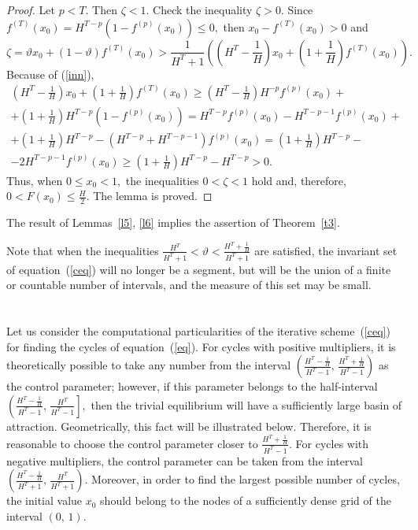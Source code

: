 \documentclass[12pt,a4paper]{amsart}
\begin{document}
\begin{proof}
Let $p<T.$ Then $\zeta < 1.$ Check the inequality $\zeta > 0.$ Since 
$f^{(T)}(x_0) = H^{T-p} \left(1 - f^{(p)}(x_0)\right) \leq 0,$ then $x_0 - f^{(T)}(x_0) > 0$ and
 $$
\zeta=\vartheta x_0 + (1-\vartheta)f^{(T)}(x_0) > 
\frac{1}{H^T + 1} \left ( \left(H^T - \frac{1}{H}\right)x_0 + \left(1 + \frac{1}{H}\right) f^{(T)}(x_0) \right).
$$
Because of (\ref{inn}), 
\begin{gather*}
\left(H^T - \frac{1}{H}\right)x_0 + \left(1 + \frac{1}{H}\right) f^{(T)}(x_0) \geq 
\left(H^T - \frac{1}{H}\right) H^{-p} f^{(p)}(x_0) + \\
+ \left(1 + \frac{1}{H}\right) H^{T-p} \left(1- f^{(p)}(x_0)\right) = H^{T-p} f^{(p)}(x_0) - H^{T-p-1} f^{(p)}(x_0) +\\
+ \left(1 + \frac{1}{H}\right) H^{T-p} - \left(H^{T-p}+H^{T-p-1}\right)f^{(p)}(x_0) = \left(1 + \frac{1}{H}\right) H^{T-p} - \\
- 2 H^{T-p-1}f^{(p)}(x_0) \geq \left(1 + \frac{1}{H}\right) H^{T-p} - H^{T-p} >0.
\end{gather*}
Thus, when $0 \leq x_0 < 1,$ the inequalities $0<\zeta<1$ hold and, therefore, $0 < F(x_0) \leq \frac{H}{2}.$ 
The lemma is proved. 
\end{proof}

The result of Lemmas~\ref{l5}, \ref{l6} implies the assertion of Theorem~\ref{t3}.

Note that when the inequalities $\frac{H^T}{H^T+1}<\vartheta<\frac{H^T+\frac{1}{H}}{H^T+1}$ are satisfied,
the invariant set of equation~(\ref{ceq}) will no longer be a segment, but will be the union of a finite or countable 
number of intervals, and the measure of this set may be small.

\section{}

Let us consider the computational particularities of the iterative scheme~(\ref{ceq}) for finding the cycles of equation~(\ref{eq}).
For cycles with positive multipliers, it is theoretically possible to take any number from the interval 
$\left(\frac{H^T - \frac{1}{H}}{H^T-1},\,\frac{H^T + \frac{1}{H}}{H^T-1}\right)$ as the control parameter;
however, if this parameter belongs to the half-interval $\left(\frac{H^T - \frac{1}{H}}{H^T-1},\,\frac{H^T}{H^T-1}\right],$
then the trivial equilibrium will have a sufficiently large basin of attraction. Geometrically, this fact will be illustrated below. 
Therefore, it is reasonable to choose the control parameter closer to $\frac{H^T + \frac{1}{H}}{H^T-1}.$ For cycles with negative 
multipliers, the control parameter can be taken from the interval 
$\left(\frac{H^T - \frac{1}{H}}{H^T + 1},\,\frac{H^T}{H^T + 1}\right).$ Moreover, in order to find the largest possible 
number of cycles, the initial value $x_0$ should belong to the nodes of a sufficiently dense grid of the interval $(0,\,1).$
\end{document}
